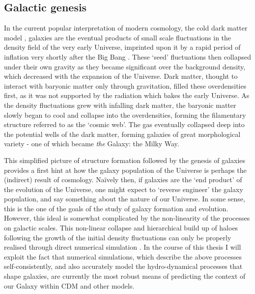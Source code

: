 \subsection{Galactic genesis}

In the current popular interpretation of modern cosmology, the cold dark matter model \citep[CDM, e.g.][]{1978MNRAS.183..341W}, galaxies are the eventual products of small scale fluctuations in the density field of the very early Universe, imprinted upon it by a rapid period of inflation very shortly after the Big Bang \citep{guth1981inflationary}. These `seed' fluctuations then collapsed under their own gravity as they became significant over the background density, which decreased with the expansion of the Universe. Dark matter, thought to interact with baryonic matter only through gravitation, filled these overdensities first, as it was not supported by the radiation which bakes the early Universe. As the density fluctuations grew with infalling dark matter, the baryonic matter slowly began to cool and collapse into the overdensities, forming the filamentary structure referred to as the `cosmic web'. The gas eventually collapsed deep into the potential wells of the dark matter, forming galaxies of great morphological variety - one of which became \emph{the} Galaxy: the Milky Way.

This simplified picture of structure formation followed by the genesis of galaxies provides a first hint at how the galaxy population of the Universe is perhaps the (indirect) result of cosmology. Na\"ively then, if galaxies are the `end product' of the evolution of the Universe, one might expect to `reverse engineer' the galaxy population, and say something about the nature of our Universe. In some sense, this is the one of the goals of the study of galaxy formation and evolution. However, this ideal is somewhat complicated by the non-linearity of the processes on galactic scales. This non-linear collapse and hierarchical build up of haloes following the growth of the initial density fluctuations can only be properly realised through direct numerical simulation \citep[e.g.][]{2005Natur.435..629S}. In the course of this thesis I will exploit the fact that numerical simulations, which describe the above processes self-consistently, and also accurately model the hydro-dynamical processes that shape galaxies, are currently the most robust means of predicting the context of our Galaxy within CDM and other models.

